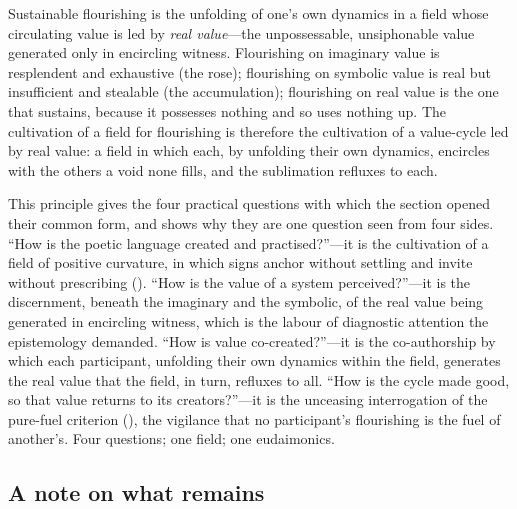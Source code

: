 \begin{claim}
Sustainable flourishing is the unfolding of one's own dynamics in a field whose circulating value is led by \emph{real value}---the unpossessable, unsiphonable value generated only in encircling witness. Flourishing on imaginary value is resplendent and exhaustive (the rose); flourishing on symbolic value is real but insufficient and stealable (the accumulation); flourishing on real value is the one that sustains, because it possesses nothing and so uses nothing up. The cultivation of a field for flourishing is therefore the cultivation of a value-cycle led by real value: a field in which each, by unfolding their own dynamics, encircles with the others a void none fills, and the sublimation refluxes to each.
\end{claim}

This principle gives the four practical questions with which the section opened their common form, and shows why they are one question seen from four sides. ``How is the poetic language created and practised?''---it is the cultivation of a field of positive curvature, in which signs anchor without settling and invite without prescribing (). ``How is the value of a system perceived?''---it is the discernment, beneath the imaginary and the symbolic, of the real value being generated in encircling witness, which is the labour of diagnostic attention the epistemology demanded. ``How is value co-created?''---it is the co-authorship by which each participant, unfolding their own dynamics within the field, generates the real value that the field, in turn, refluxes to all. ``How is the cycle made good, so that value returns to its creators?''---it is the unceasing interrogation of the pure-fuel criterion (), the vigilance that no participant's flourishing is the fuel of another's. Four questions; one field; one eudaimonics.

\subsection{A note on what remains}
\label{p09:sec:remains}

